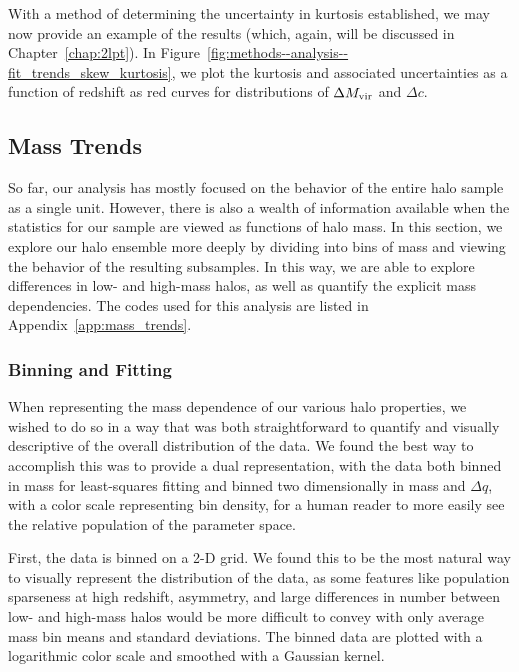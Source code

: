 With a method of determining the uncertainty in kurtosis established, we may now provide an example of the results (which, again, will be discussed in Chapter~\ref{chap:2lpt}).  In Figure~\ref{fig:methods--analysis--fit_trends_skew_kurtosis}, we plot the kurtosis and associated uncertainties as a function of redshift as red curves for distributions of $\Delta {M_{\mathrm{vir}}}$ and $\Delta c$.




\subsection{Mass Trends}
\label{subsec:analysis--mass_trends}


So far, our analysis has mostly focused on the behavior of the entire halo sample as a single unit.  However, there is also a wealth of information available when the statistics for our sample are viewed as functions of halo mass.  In this section, we explore our halo ensemble more deeply by dividing into bins of mass and viewing the behavior of the resulting subsamples.  In this way, we are able to explore differences in low- and high-mass halos, as well as quantify the explicit mass dependencies.  The codes used for this analysis are listed in Appendix~\ref{app:mass_trends}.



\subsubsection{Binning and Fitting}
\label{subsubsec:analysis--mass_trends--binning_plotting}


When representing the mass dependence of our various halo properties, we wished to do so in a way that was both straightforward to quantify and visually descriptive of the overall distribution of the data.  We found the best way to accomplish this was to provide a dual representation, with the data both binned in mass for least-squares fitting and binned two dimensionally in mass and $\Delta q$, with a color scale representing bin density, for a human reader to more easily see the relative population of the parameter space.

First, the data is binned on a 2-D grid.  We found this to be the most natural way to visually represent the distribution of the data, as some features like population sparseness at high redshift, asymmetry, and large differences in number between low- and high-mass halos would be more difficult to convey with only average mass bin means and standard deviations.  The binned data are plotted with a logarithmic color scale and smoothed with a Gaussian kernel.

